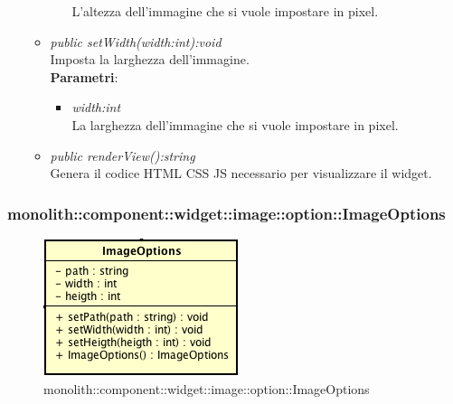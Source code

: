 \begin{itemize}
\begin{itemize}
\begin{itemize}
		L'altezza dell'immagine che si vuole impostare in pixel.
		\end{itemize} 
	\item \textit{public setWidth(width:int):void}\\
	Imposta la larghezza dell'immagine.
		\\ \textbf{Parametri}: \begin{itemize}
		\item \textit{width:int}\\
		La larghezza dell'immagine che si vuole impostare in pixel.
		\end{itemize} 
	\item \textit{public renderView():string}\\
	Genera il codice HTML CSS JS necessario per visualizzare il widget.
	\end{itemize}
\end{itemize}

\subsubsection{monolith::component::widget::image::option::ImageOptions}

\label{monolith::component::widget::image::option::ImageOptions}
\begin{figure}[H]
	\centering
	\includegraphics[scale=0.5]{Sezioni/SottosezioniST/img/ImageOptions.png}
	\caption{monolith::component::widget::image::option::ImageOptions}
\end{figure}


